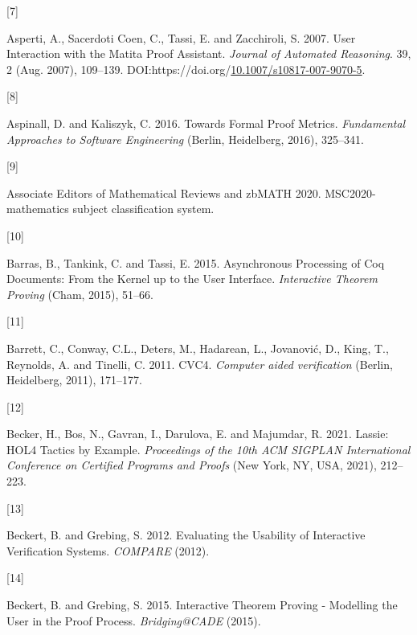 \documentclass[
]{article}
\newlength{\cslhangindent}
\newlength{\csllabelwidth}
\newlength{\cslentryspacingunit} %
\newenvironment{CSLReferences}[2] %
 {%
  \setlength{\parindent}{0pt}
  \ifodd #1
  \let\oldpar\par
  \def\par{\hangindent=\cslhangindent\oldpar}
  \fi
  \setlength{\parskip}{#2\cslentryspacingunit}
 }%
 {}
\newcommand{\CSLLeftMargin}[1]{\parbox[t]{\csllabelwidth}{#1}}
\newcommand{\CSLRightInline}[1]{\parbox[t]{\linewidth - \csllabelwidth}{#1}\break}
\begin{document}
\begin{CSLReferences}{0}{0}
\leavevmode{}%
\CSLLeftMargin{{[}7{]} }
\CSLRightInline{Asperti, A., Sacerdoti Coen, C., Tassi, E. and
Zacchiroli, S. 2007. User {Interaction} with the {Matita} {Proof}
{Assistant}. \emph{Journal of Automated Reasoning}. 39, 2 (Aug. 2007),
109--139.
DOI:https://doi.org/\href{https://doi.org/10.1007/s10817-007-9070-5}{10.1007/s10817-007-9070-5}.}

\leavevmode{}%
\CSLLeftMargin{{[}8{]} }
\CSLRightInline{Aspinall, D. and Kaliszyk, C. 2016. Towards {Formal}
{Proof} {Metrics}. \emph{Fundamental {Approaches} to {Software}
{Engineering}} (Berlin, Heidelberg, 2016), 325--341.}

\leavevmode{}%
\CSLLeftMargin{{[}9{]} }
\CSLRightInline{Associate Editors of Mathematical Reviews and zbMATH
2020. MSC2020-mathematics subject classification system.}

\leavevmode{}%
\CSLLeftMargin{{[}10{]} }
\CSLRightInline{Barras, B., Tankink, C. and Tassi, E. 2015. Asynchronous
{Processing} of {Coq} {Documents}: {From} the {Kernel} up to the {User}
{Interface}. \emph{Interactive {Theorem} {Proving}} (Cham, 2015),
51--66.}

\leavevmode{}%
\CSLLeftMargin{{[}11{]} }
\CSLRightInline{Barrett, C., Conway, C.L., Deters, M., Hadarean, L.,
Jovanović, D., King, T., Reynolds, A. and Tinelli, C. 2011. CVC4.
\emph{Computer aided verification} (Berlin, Heidelberg, 2011),
171--177.}

\leavevmode{}%
\CSLLeftMargin{{[}12{]} }
\CSLRightInline{Becker, H., Bos, N., Gavran, I., Darulova, E. and
Majumdar, R. 2021. Lassie: {HOL4} {Tactics} by {Example}.
\emph{Proceedings of the 10th {ACM} {SIGPLAN} {International}
{Conference} on {Certified} {Programs} and {Proofs}} (New York, NY, USA,
2021), 212--223.}

\leavevmode{}%
\CSLLeftMargin{{[}13{]} }
\CSLRightInline{Beckert, B. and Grebing, S. 2012. Evaluating the
{Usability} of {Interactive} {Verification} {Systems}. \emph{{COMPARE}}
(2012).}

\leavevmode{}%
\CSLLeftMargin{{[}14{]} }
\CSLRightInline{Beckert, B. and Grebing, S. 2015. Interactive {Theorem}
{Proving} - {Modelling} the {User} in the {Proof} {Process}.
\emph{Bridging@{CADE}} (2015).}


\end{CSLReferences}
\end{document}
